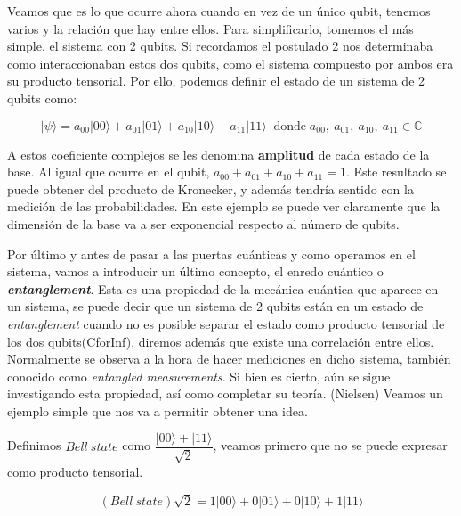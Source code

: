 Veamos que es lo que ocurre ahora cuando en vez de un único qubit, tenemos varios y la relación que hay entre ellos. Para simplificarlo, tomemos el más simple, el sistema con 2 qubits. Si recordamos el postulado 2 nos determinaba como interaccionaban estos dos qubits, como el sistema compuesto por ambos era su producto tensorial. Por ello, podemos definir el estado de un sistema de 2 qubits como:

    \begin{equation*}|\psi\rangle = a_{00}|00\rangle + a_{01}|01\rangle + a_{10}|10\rangle + a_{11}|11\rangle \;\;\text{donde}\; a_{00},\: a_{01}, \:a_{10}, \:a_{11} \in \mathbb{C}
    \end{equation*}

 A estos coeficiente complejos se les denomina \textbf{amplitud} de cada estado de la base. Al igual que ocurre en el qubit, $a_{00}+a_{01}+a_{10}+a_{11}=1$. Este resultado se puede obtener del producto de Kronecker, y además tendría sentido con la medición de las probabilidades. En este ejemplo se puede ver claramente que la dimensión de la base va a ser exponencial respecto al número de qubits.\newline
 
 Por último y antes de pasar a las puertas cuánticas y como operamos en el sistema, vamos a introducir un último concepto, el enredo cuántico o \textbf{\textit{entanglement}}. Esta es una propiedad de la mecánica cuántica que aparece en un sistema, se puede decir que un sistema de 2 qubits están en un estado de \textit{entanglement} cuando no es posible separar el estado como producto tensorial de los dos qubits(CforInf), diremos además que existe una correlación entre ellos. Normalmente se observa a la hora de hacer mediciones en dicho sistema, también conocido como \textit{entangled measurements}. Si bien es cierto, aún se sigue investigando esta propiedad, así como completar su teoría. (Nielsen)  Veamos un ejemplo simple que nos va a permitir obtener una idea. \newline

 Definimos $Bell\:state $ como $ \dfrac{|00\rangle + |11\rangle}{\sqrt{2}}$, veamos primero que no se puede expresar como producto tensorial. 

 \begin{equation*}
     (Bell\:state)\sqrt{2} = 1|00\rangle+ 0|01\rangle+ 0|10\rangle+ 1|11\rangle
 \end{equation*}
 
 \vspace{3pt}

